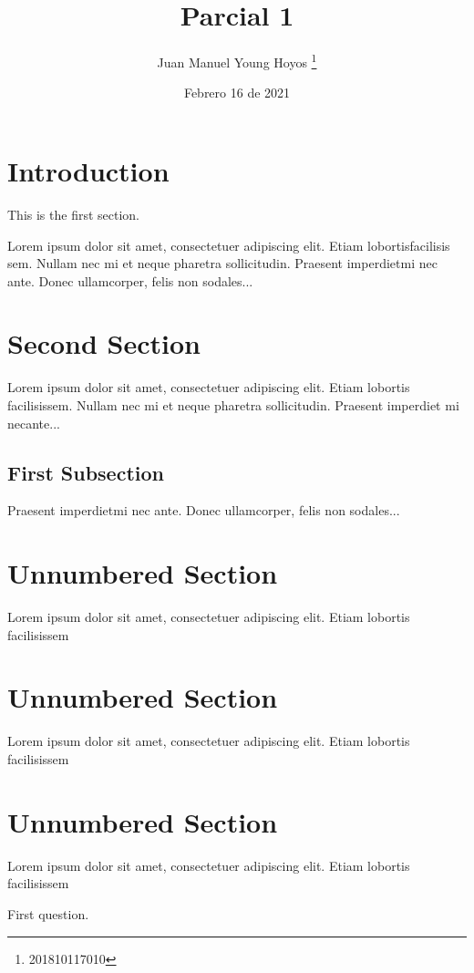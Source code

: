 \documentclass[12pt, letterpaper, twoside]{article}
\title{Parcial 1}
\date{Febrero 16 de 2021}
\author{Juan Manuel Young Hoyos \thanks{201810117010}}
\begin{document}
    \maketitle

    \section{Introduction}

    This is the first section.

    Lorem  ipsum  dolor  sit  amet,  consectetuer  adipiscing  
    elit.   Etiam  lobortisfacilisis sem.  Nullam nec mi et 
    neque pharetra sollicitudin.  Praesent imperdietmi nec ante. 
    Donec ullamcorper, felis non sodales...

    \section{Second Section}

    Lorem ipsum dolor sit amet, consectetuer adipiscing elit.  
    Etiam lobortis facilisissem.  Nullam nec mi et neque pharetra 
    sollicitudin.  Praesent imperdiet mi necante...

    \subsection{First Subsection}
    Praesent imperdietmi nec ante. Donec ullamcorper, felis non sodales...

    \section*{Unnumbered Section}
    Lorem ipsum dolor sit amet, consectetuer adipiscing elit.  
    Etiam lobortis facilisissem
 
    \section*{Unnumbered Section}
    Lorem ipsum dolor sit amet, consectetuer adipiscing elit.  
    Etiam lobortis facilisissem
    
    \section*{Unnumbered Section}
    Lorem ipsum dolor sit amet, consectetuer adipiscing elit.  
    Etiam lobortis facilisissem
    
   
    First question.
\end{document}
